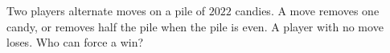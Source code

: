 Two players alternate moves on a pile of $2022$ candies. A move removes one candy, or removes half the pile when the pile is even. A player with no move loses. Who can force a win?
